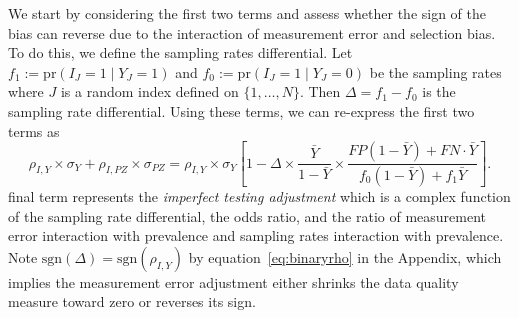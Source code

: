 \documentclass[11pt]{amsart}
\numberwithin{equation}{section}
\theoremstyle{plain}
\def\pr{\text{pr}}
\def\sgn{\text{sgn}}
\begin{document}
We start by considering the first two terms and assess whether the sign of the bias can reverse due to the interaction of measurement error and selection bias.  To do this, we define the sampling rates differential.  Let $f_1 := \pr (I_J = 1 \mid Y_J = 1)$ and $f_0 := \pr(I_J = 1 \mid Y_J = 0)$ be the sampling rates where $J$ is a random index defined on $\{1,\ldots, N\}$.  Then $\Delta = f_1 - f_0$ is the sampling rate differential.  Using these terms, we can re-express the first two terms as
$$
\rho_{I,Y} \times \sigma_Y + \rho_{I,PZ} \times \sigma_{PZ} =
\rho_{I,Y} \times \sigma_Y \left[ 1 - \Delta \times \frac{\bar Y}{1-\bar Y} \times \frac{FP(1-\bar Y) + FN \cdot \bar Y}{f_0 (1-\bar Y) + f_1 \bar Y} \right].
$$
final term represents the \emph{imperfect testing adjustment} which is a complex function of the sampling rate differential, the odds ratio, and the ratio of measurement error interaction with prevalence and sampling rates interaction with prevalence. Note $\sgn(\Delta) = \sgn(\rho_{I,Y})$ by equation~\ref{eq:binaryrho} in the Appendix, which implies the measurement error adjustment either shrinks the data quality measure toward zero or reverses its sign.


\end{document}
